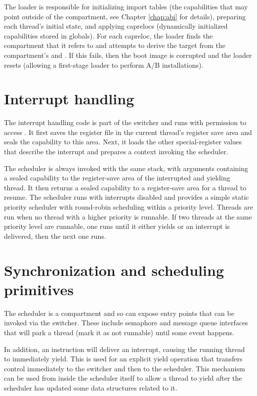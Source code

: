 The loader is responsible for initializing import tables (the capabilities that may point outside of the compartment, see Chapter \ref{chap:abi} for details), preparing each thread's initial state, and applying caprelocs (dynamically initialized capabilities stored in globals).
For each capreloc, the loader finds the compartment that it refers to and attempts to derive the target from the compartment's \PCC{} and \CGP{}.
If this fails, then the boot image is corrupted and the loader resets (allowing a first-stage loader to perform A/B installations).

\section{Interrupt handling}

The interrupt handling code is part of the switcher and runs with permission to access \MScratchC{}.
It first saves the register file in the current thread's register save area and seals the capability to this area.
Next, it loads the other special-register values that describe the interrupt and prepares a context invoking the scheduler.

The scheduler is always invoked with the same stack, with arguments containing a sealed capability to the register-save area of the interrupted and yielding thread.
It then returns a sealed capability to a register-save area for a thread to resume.
The scheduler runs with interrupts disabled and provides a simple static priority scheduler with round-robin scheduling within a priority level.
Threads are run when no thread with a higher priority is runnable.
If two threads at the same priority level are runnable, one runs until it either yields or an interrupt is delivered, then the next one runs.

\section{Synchronization and scheduling primitives}

The scheduler is a compartment and so can expose entry points that can be invoked via the switcher.
These include semaphore and message queue interfaces that will park a thread (mark it as not runnable) until some event happens.

In addition, an  instruction will deliver an interrupt, causing the running thread to immediately yield.
This is used for an explicit yield operation that transfers control immediately to the switcher and then to the scheduler.
This mechanism can be used from inside the scheduler itself to allow a thread to yield after the scheduler has updated some data structures related to it.


